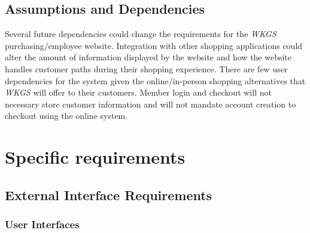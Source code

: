 \documentclass{scrreprt}
\theoremstyle{funreq}
\begin{document}
\section{Assumptions and Dependencies}
Several future dependencies could change the requirements for the \textit{WKGS} purchasing/employee website. Integration with other shopping applications could alter the amount of information displayed by the website and how the website handles customer paths during their shopping experience. There are few user dependencies for the system given the online/in-person shopping alternatives that \textit{WKGS} will offer to their customers. Member login and checkout will not necessary store customer information and will not mandate account creation to checkout using the online system. %


{\let\clearpage\relax 
\chapter{Specific requirements}}

\section{External Interface Requirements}

\subsection{User Interfaces}
\end{document}
